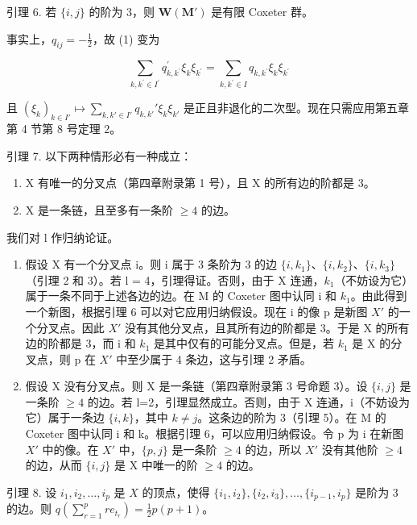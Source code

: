 引理 6. 若 \(\{i,j\}\) 的阶为 3，则 \(\mathbf{W}(\mathbf{M}')\) 是有限 Coxeter 群。

事实上，\(q_{ij} = -\frac{1}{2}\)，故 (1) 变为

\[
\sum_ {k, k ^ {\prime} \in I ^ {\prime}} q _ {k, k ^ {\prime}} ^ {\prime} \xi_ {k} \xi_ {k ^ {\prime}} = \sum_ {k, k ^ {\prime} \in I} q _ {k, k ^ {\prime}} \xi_ {k} \xi_ {k ^ {\prime}}
\]

且 \((\xi_k)_{k\in I'}\mapsto \sum_{k,k'\in I'}q_{k,k'}'\xi_k\xi_{k'}\) 是正且非退化的二次型。现在只需应用第五章第 4 节第 8 号定理 2。

引理 7. 以下两种情形必有一种成立：

\begin{enumerate}
\def\labelenumi{\alph{enumi})}
\item
  X 有唯一的分叉点（第四章附录第 1 号），且 X 的所有边的阶都是 3。
\item
  X 是一条链，且至多有一条阶 \(\geqslant 4\) 的边。
\end{enumerate}

我们对 l 作归纳论证。

\begin{enumerate}
\def\labelenumi{\alph{enumi})}
\item
  假设 X 有一个分叉点 i。则 i 属于 3 条阶为 3 的边 \(\{i, k_{1}\}\)、\(\{i, k_{2}\}\)、\(\{i, k_{3}\}\)（引理 2 和 3）。若 l = 4，引理得证。否则，由于 X 连通，\(k_{1}\)（不妨设为它）属于一条不同于上述各边的边。在 M 的 Coxeter 图中认同 i 和 \(k_{1}\)。由此得到一个新图，根据引理 6 可以对它应用归纳假设。现在 i 的像 p 是新图 \(X'\) 的一个分叉点。因此 \(X'\) 没有其他分叉点，且其所有边的阶都是 3。于是 X 的所有边的阶都是 3，而 i 和 \(k_{1}\) 是其中仅有的可能分叉点。但是，若 \(k_{1}\) 是 X 的分叉点，则 p 在 \(X'\) 中至少属于 4 条边，这与引理 2 矛盾。
\item
  假设 X 没有分叉点。则 X 是一条链（第四章附录第 3 号命题 3）。设 \(\{i,j\}\) 是一条阶 \(\geqslant4\) 的边。若 l=2，引理显然成立。否则，由于 X 连通，i（不妨设为它）属于一条边 \(\{i,k\}\)，其中 \(k\neq j\)。这条边的阶为 3（引理 5）。在 M 的 Coxeter 图中认同 i 和 k。根据引理 6，可以应用归纳假设。令 p 为 i 在新图 \(X'\) 中的像。在 \(X'\) 中，\(\{p,j\}\) 是一条阶 \(\geqslant4\) 的边，所以 \(X'\) 没有其他阶 \(\geqslant4\) 的边，从而 \(\{i,j\}\) 是 X 中唯一的阶 \(\geqslant4\) 的边。
\end{enumerate}

引理 8. 设 \(i_1, i_2, \ldots, i_p\) 是 \(X\) 的顶点，使得 \(\{i_1, i_2\}, \{i_2, i_3\}, \ldots, \{i_{p-1}, i_p\}\) 是阶为 3 的边。则 \(q(\sum_{r=1}^{p} re_{t_r}) = \frac{1}{2} p(p + 1)\)。

